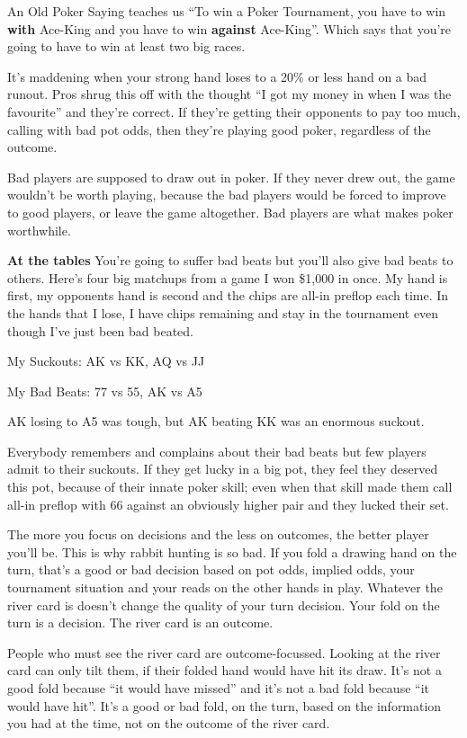 An Old Poker Saying teaches us ``To win a
Poker Tournament, you have to win \textbf{with} Ace-King and
you have to win \textbf{against} Ace-King''. Which says that you're
going to have to win at least two big races.

It's maddening when your strong hand loses to a 20\% or less
hand on a bad runout. Pros shrug this off with
the thought ``I got my money in when I was the favourite'' and they're
correct. If they're getting their opponents to pay too much, calling
with bad pot odds, then they're playing good poker, regardless of
the outcome.

Bad players are supposed to draw out in poker. If they never drew
out, the game wouldn't be worth playing, because the bad players
would be forced to improve to good players, or leave the game
altogether. Bad players are what makes poker worthwhile.

\textbf{At the tables} You're going to suffer bad beats but you'll
also give bad beats to others. Here's four big matchups from a game
I won \$1,000 in once. My hand is first, my opponents hand is second
and the chips are all-in preflop each time. In the hands that I
lose, I have chips remaining and stay in the tournament even
though I've just been bad beated.

My Suckouts: AK vs KK, AQ vs JJ

My Bad Beats: 77 vs 55, AK vs A5

AK losing to A5 was tough, but AK beating KK was an enormous suckout.

Everybody remembers and complains about their bad beats but few
players admit to their suckouts. If they get lucky in a big pot, they
feel they deserved this pot, because of their innate poker skill;
even when that skill made them call all-in preflop with 66 against an
obviously higher pair and they lucked their set.


The more you focus on decisions and the less on outcomes, the
better player you'll be. This is why rabbit hunting is so bad. If
you fold a drawing hand on the turn, that's a good or bad decision
based on pot odds, implied odds, your tournament situation
and your reads on the other hands in play. Whatever the river card is
doesn't change the quality of your turn decision. Your fold on the
turn is a decision. The river card is an outcome.

People who must see the river card are outcome-focussed. Looking
at the river card can only tilt them, if their folded hand would
have hit its draw. It's not a good fold because ``it would have
missed'' and it's not a bad fold because ``it would have hit''. It's
a good or bad fold, on the turn, based on the information you
had at the time, not on the outcome of the river card.

